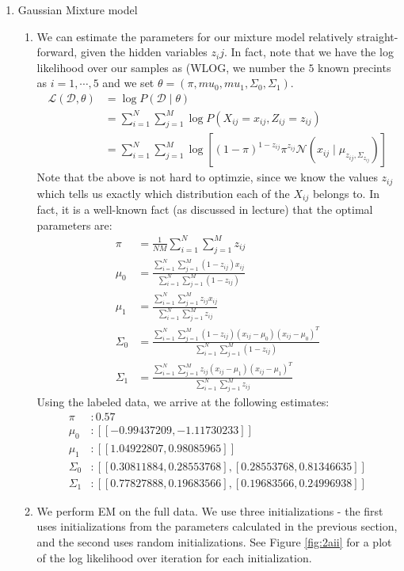 \documentclass[12pt]{article}
\begin{document}
\begin{enumerate}[label=(\Alph*)]
  \item Gaussian Mixture model
  	\begin{enumerate}[label=(\roman*)]
  		\item We can estimate the parameters for our mixture model relatively straight-forward, given the hidden variables $z_ij$. In fact, note that we have the log likelihood over our samples as (WLOG, we number the $5$ known precints as $i=1,\cdots,5$ and we set $\theta = (\pi, mu_0, mu_1, \Sigma_0, \Sigma_1)$.
  		\begin{align*}
  			\mathcal{L}(\mathcal{D}, \theta) &= \log P(\mathcal{D} \mid \theta) \\
  			&=\sum_{i=1}^N \sum_{j=1}^M \log P(X_{ij} = x_{ij}, Z_{ij} = z_{ij}) \\
  			&=\sum_{i=1}^N \sum_{j=1}^M \log \left[ (1-\pi)^{1-z_{ij}}\pi^{z_{ij}}\mathcal{N}(x_{ij} \mid \mu_{z_{ij}, \Sigma_{z_{ij}}})\right]
  		\end{align*}
  		Note that tbe above is not hard to optimzie, since we know the values $z_{ij}$ which tells us exactly which distribution each of the $X_{ij}$ belongs to. In fact, it is a well-known fact (as discussed in lecture) that the optimal parameters are:
  		\begin{align*}
  			\pi &= \frac{1}{NM} \sum_{i=1}^N \sum_{j=1}^M z_{ij} \\
  			\mu_0 &= \frac{\sum_{i=1}^N \sum_{j=1}^M (1 - z_{ij})x_{ij}}{\sum_{i=1}^N \sum_{j=1}^M (1-z_{ij})} \\
  			\mu_1 &= \frac{\sum_{i=1}^N \sum_{j=1}^M z_{ij} x_{ij}}{\sum_{i=1}^N \sum_{j=1}^M z_{ij}} \\
  			\Sigma_0 &= \frac{\sum_{i=1}^N \sum_{j=1}^M (1-z_{ij}) (x_{ij} - \mu_0)(x_{ij} - \mu_0)^T}{\sum_{i=1}^N \sum_{j=1}^M (1-z_{ij})} \\
  			\Sigma_1 &= \frac{\sum_{i=1}^N \sum_{j=1}^M z_{ij} (x_{ij} - \mu_1)(x_{ij} - \mu_1)^T}{\sum_{i=1}^N \sum_{j=1}^M z_{ij}}
  		\end{align*}
  		Using the labeled data, we arrive at the following estimates:
  		\begin{align*}
  		\pi &: 0.57 \\
			\mu_0 &: [[-0.99437209, -1.11730233]] \\
			\mu_1 &: [[1.04922807, 0.98085965]] \\
			\Sigma_0 &: [[0.30811884, 0.28553768], [0.28553768, 0.81346635]]\\
			\Sigma_1 &: [[0.77827888,0.19683566],[0.19683566, 0.24996938]]
		 \end{align*}
		\item We perform EM on the full data. We use three initializations - the first uses initializations from the parameters calculated in the previous section, and the second uses random initializations. See Figure \ref{fig:2aii} for a plot of the log likelihood over iteration for each initialization.


\end{enumerate}
\end{enumerate}
\end{document}
